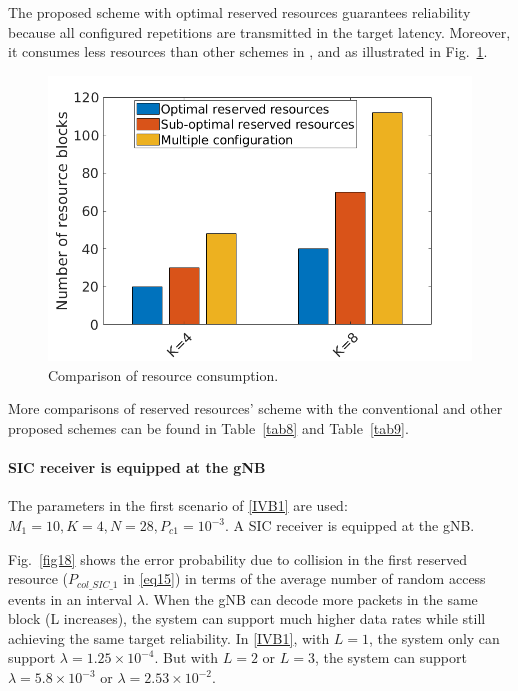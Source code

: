 \documentclass{ieeeaccess}
\begin{document}
The proposed scheme with optimal reserved resources guarantees reliability because all configured repetitions are transmitted in the target latency. Moreover, it consumes less resources than other schemes in \cite{ref7}, \cite{ref10} and \cite{ref11} as illustrated in Fig.~\ref{fig19}. 

\begin{figure}[htbp]
\centerline{\includegraphics[scale=0.4]{fig19.png}}
\caption{Comparison of resource consumption.}
\label{fig19}
\vspace{-2mm}
\end{figure}

More comparisons of reserved resources' scheme with the conventional and other proposed schemes can be found in Table~\ref{tab8} and Table~\ref{tab9}.

\paragraph{SIC receiver is equipped at the gNB}\label{IVB2}

The parameters in the first scenario of \ref{IVB1} are used:  $M_1=10, K=4, N=28, P_{c1}=10^{-3}$. A SIC receiver is equipped at the gNB. 

Fig.~\ref{fig18} shows the error probability due to collision in the first reserved resource ($P_{col\_SIC\_1}$ in \eqref{eq15}) in terms of  the average number of random access events in an interval $\lambda$. When the gNB can decode more packets in the same block (L increases), the system can support much higher data rates while still achieving the same target reliability. In \ref{IVB1}, with $L=1$, the system only can support $\lambda=1.25\times10^{-4}$. But with $L=2$ or $L=3$, the system can support $\lambda=5.8\times10^{-3}$ or $\lambda=2.53\times10^{-2}$.
\end{document}
